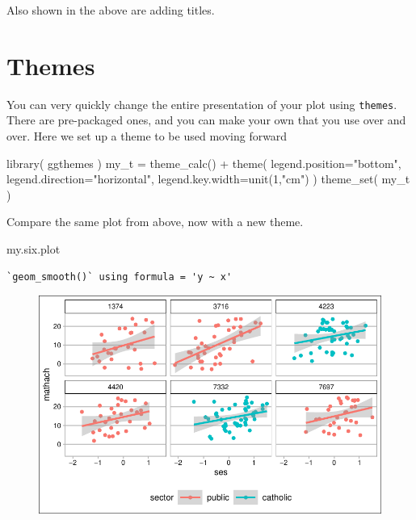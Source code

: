 \documentclass[
  letterpaper,
  DIV=11,
  numbers=noendperiod]{scrreprt}
\newenvironment{Shaded}{\begin{snugshade}}{\end{snugshade}}
\newcommand{\AttributeTok}[1]{\textcolor[rgb]{0.49,0.56,0.16}{#1}}
\newcommand{\DecValTok}[1]{\textcolor[rgb]{0.25,0.63,0.44}{#1}}
\newcommand{\FunctionTok}[1]{\textcolor[rgb]{0.02,0.16,0.49}{#1}}
\newcommand{\NormalTok}[1]{\textcolor[rgb]{0.00,0.44,0.13}{#1}}
\newcommand{\OtherTok}[1]{\textcolor[rgb]{0.00,0.44,0.13}{#1}}
\newcommand{\SpecialCharTok}[1]{\textcolor[rgb]{0.25,0.44,0.63}{#1}}
\newcommand{\StringTok}[1]{\textcolor[rgb]{0.25,0.44,0.63}{#1}}
\begin{document}
Also shown in the above are adding titles.

\hypertarget{themes}{%
\section{Themes}\label{themes}}

You can very quickly change the entire presentation of your plot using
\texttt{themes}. There are pre-packaged ones, and you can make your own
that you use over and over. Here we set up a theme to be used moving
forward

\begin{Shaded}
\begin{Highlighting}[]
\FunctionTok{library}\NormalTok{( ggthemes )}
\NormalTok{my\_t }\OtherTok{=} \FunctionTok{theme\_calc}\NormalTok{() }\SpecialCharTok{+} \FunctionTok{theme}\NormalTok{( }\AttributeTok{legend.position=}\StringTok{"bottom"}\NormalTok{, }
                             \AttributeTok{legend.direction=}\StringTok{"horizontal"}\NormalTok{, }
                             \AttributeTok{legend.key.width=}\FunctionTok{unit}\NormalTok{(}\DecValTok{1}\NormalTok{,}\StringTok{"cm"}\NormalTok{)  )}
\FunctionTok{theme\_set}\NormalTok{( my\_t )}
\end{Highlighting}
\end{Shaded}

Compare the same plot from above, now with a new theme.

\begin{Shaded}
\begin{Highlighting}[]
\NormalTok{my.six.plot}
\end{Highlighting}
\end{Shaded}

\begin{verbatim}
`geom_smooth()` using formula = 'y ~ x'
\end{verbatim}

\begin{figure}[H]

{\centering \includegraphics{intro_ggplot_files/figure-pdf/unnamed-chunk-10-1.pdf}

}

\end{figure}
\end{document}
